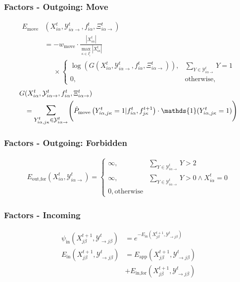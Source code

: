 \begin{frame}[plain]
    \frametitle{Factors - Outgoing: Move}
    \begin{align*}
        E_{\text{move}}&(X_{i\alpha}^t, \mathcal{Y}_{i\alpha\rightarrow}^{t}, f_{i\alpha}^t,
        \Xi_{i\alpha\rightarrow}^{t}) \\ \nonumber
        &=-w_{\text{move}} \cdot \frac{|X_{i\alpha}^t|}{\max_{\kappa \in I_i^t}|X_{i\kappa}^t|} \\
        \nonumber
        &\phantom{=}\times
        \begin{cases}
            \log (G(X_{i\alpha}^t, \mathcal{Y}_{i\alpha\rightarrow}^{t}, f_{i\alpha}^t,
            \Xi_{i\alpha\rightarrow}^{t})), & \sum_{Y\in\mathcal{Y}_{i\alpha\rightarrow}^{t}}Y=1 \\
            0, &\text{otherwise},
        \end{cases}
    \end{align*}
    \begin{align*}
        G&(X_{i\alpha}^t, \mathcal{Y}_{i\alpha\rightarrow}^{t}, f_{i\alpha}^t,
        \Xi_{i\alpha\rightarrow}^{t}) \\ \nonumber
        &=\mathlarger{\mathlarger{\sum}}_{\mathsmaller{\substack{Y_{i\alpha,j\kappa}^t \in \mathcal{Y}_{i\alpha\rightarrow}^{t}}}}
        \Bigg(\hat{P}_{\mathrm{move}}\left(Y_{i\alpha,j\kappa}^t=1|f_{i\alpha}^t,f_{j\kappa}^{t+1}\right)
        \cdot\mathds{1}(Y_{i\alpha,j\kappa}^t=1)\Bigg)
    \end{align*}
\end{frame}


\begin{frame}[plain]
    \frametitle{Factors - Outgoing: Forbidden}
    \begin{align*}
        E_{\text{out,for}}(X_{i\alpha}^t, \mathcal{Y}_{i\alpha\rightarrow}^{t})=
        \begin{cases}
            \infty, & \sum_{Y \in \mathcal{Y}_{i\alpha\rightarrow}^{t}}Y > 2 \\
            \infty, & \sum_{Y \in \mathcal{Y}_{i\alpha\rightarrow}^{t}}Y > 0 \wedge X_{i\alpha}^t = 0 \\
            0, \text{otherwise}
        \end{cases}
    \end{align*}
\end{frame}


\begin{frame}[plain]
    \frametitle{Factors - Incoming}
    \begin{align*}
        \psi_{\mathrm{in}}(X_{j\beta}^{t+1}, \mathcal{Y}_{\rightarrow j\beta}^{t})
        &= e^{-E_{\text{in}}(X_{j\beta}^{t+1},  \mathcal{Y}_{\rightarrow j\beta}^{t})} \\
        E_\text{in}(X_{j\beta}^{t+1},  \mathcal{Y}_{\rightarrow j\beta}^{t}) &= E_{\text{app}}(X_{j\beta}^{t+1},
        \mathcal{Y}_{\rightarrow j\beta}^{t}) \\
        &+ E_{\text{in,for}}(X_{j\beta}^{t+1},  \mathcal{Y}_{\rightarrow j\beta}^{t})
    \end{align*}
\end{frame}


